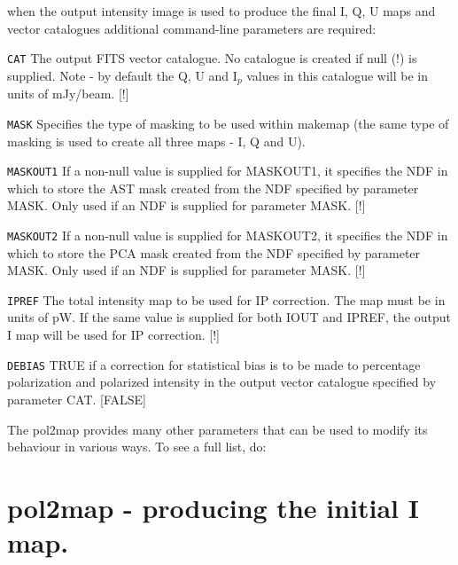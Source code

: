 when the output intensity image is used to produce the final I, Q, U
maps and vector catalogues additional command-line parameters are
required:

\begin{aligndesc}

\item[\texttt{CAT}] The output FITS vector catalogue. No catalogue is
  created if null (!) is supplied. Note - by default the Q, U and
  I$_{p}$ values in this catalogue will be in units of mJy/beam. [!]


\item[\texttt{MASK}] Specifies the type of masking to be used within
  makemap (the same type of masking is used to create all three maps -
  I, Q and U).


\item[\texttt{MASKOUT1}] If a non-null value is supplied for MASKOUT1,
  it specifies the NDF in which to store the AST mask created from the
  NDF specified by parameter MASK. Only used if an NDF is supplied for
  parameter MASK. [!]


\item[\texttt{MASKOUT2}] If a non-null value is supplied for MASKOUT2,
  it specifies the NDF in which to store the PCA mask created from the
  NDF specified by parameter MASK. Only used if an NDF is supplied for
  parameter MASK. [!]


\item[\texttt{IPREF}] The total intensity map to be used for IP
  correction. The map must be in units of pW. If the same value is
  supplied for both IOUT and IPREF, the output I map will be used for
  IP correction. [!]

\item[\texttt{DEBIAS}] TRUE if a correction for statistical bias is to
  be made to percentage polarization and polarized intensity in the
  output vector catalogue specified by parameter CAT. [FALSE]
\end{aligndesc}

The pol2map provides many other parameters that can be used to modify its
behaviour in various ways. To see a full list, do:

\begin{terminalv}
\end{terminalv}


\section{pol2map - producing the initial I map.}


